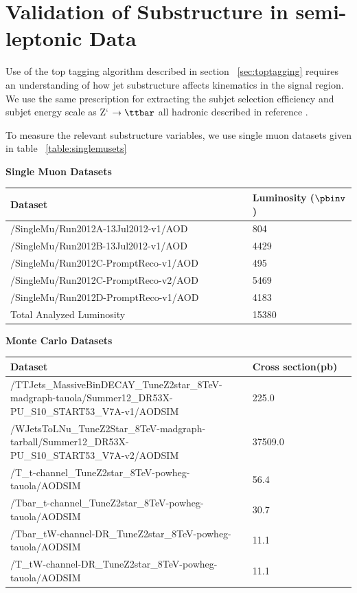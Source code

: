 \section{Validation of Substructure in semi-leptonic Data}
\label{sec:semilep}
Use of the top tagging algorithm described in section ~\ref{sec:toptagging} requires an understanding of how jet substructure affects kinematics in the signal region.
We use the same prescription for extracting the subjet selection efficiency and subjet energy scale as Z` $\to \ttbar$ all hadronic described in reference  \cite{7tevZprime}.

To measure the relevant substructure variables, we use single muon datasets given in table ~\ref{table:singlemusets} 

\begin{table}
\begin{center}
\bf{Single Muon Datasets}
\begin{tabular}{|p{0.7\linewidth}|p{0.3\linewidth}|}
\hline
\bf{Dataset} & \bf{Luminosity ($\pbinv$)} \\
\hline
/SingleMu/Run2012A-13Jul2012-v1/AOD & 804 \\
/SingleMu/Run2012B-13Jul2012-v1/AOD & 4429 \\
/SingleMu/Run2012C-PromptReco-v1/AOD 	 & 495 \\
/SingleMu/Run2012C-PromptReco-v2/AOD 	 & 5469 \\
/SingleMu/Run2012D-PromptReco-v1/AOD 	 & 4183 \\
\hline
Total Analyzed Luminosity &  15380 \\
\hline
\end{tabular}
\bf{Monte Carlo Datasets} \\
\begin{tabular}{|p{0.7\linewidth}|p{0.3\linewidth}|}
\hline
\bf{Dataset} & \bf{Cross section(pb)} \\
\hline
/TTJets\_MassiveBinDECAY\_TuneZ2star\_8TeV-madgraph-tauola/Summer12\_DR53X-PU\_S10\_START53\_V7A-v1/AODSIM & 225.0\\
/WJetsToLNu\_TuneZ2Star\_8TeV-madgraph-tarball/Summer12\_DR53X-PU\_S10\_START53\_V7A-v2/AODSIM & 37509.0\\
/T\_t-channel\_TuneZ2star\_8TeV-powheg-tauola/AODSIM & 56.4\\
/Tbar\_t-channel\_TuneZ2star\_8TeV-powheg-tauola/AODSIM & 30.7\\
/Tbar\_tW-channel-DR\_TuneZ2star\_8TeV-powheg-tauola/AODSIM & 11.1\\
/T\_tW-channel-DR\_TuneZ2star\_8TeV-powheg-tauola/AODSIM & 11.1\\

\end{tabular}
\end{center}
\end{table}
